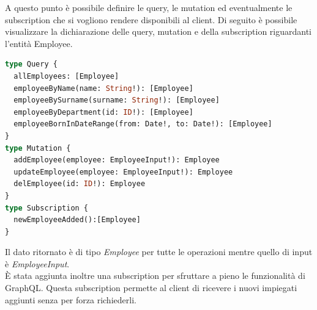 A questo punto è possibile definire le query, le mutation ed eventualmente le subscription che si vogliono rendere disponibili al client. Di seguito è possibile visualizzare la dichiarazione delle query, mutation e della subscription riguardanti l'entità Employee.
\begin{lstlisting}[language=GraphQL, title={schema.graphqls}]
type Query {
  allEmployees: [Employee]
  employeeByName(name: String!): [Employee]
  employeeBySurname(surname: String!): [Employee]
  employeeByDepartment(id: ID!): [Employee]
  employeeBornInDateRange(from: Date!, to: Date!): [Employee]
}
type Mutation {
  addEmployee(employee: EmployeeInput!): Employee
  updateEmployee(employee: EmployeeInput!): Employee
  delEmployee(id: ID!): Employee
}
type Subscription {
  newEmployeeAdded():[Employee]
}
\end{lstlisting}
Il dato ritornato è di tipo \textit{Employee} per tutte le operazioni mentre quello di input è \textit{EmployeeInput}.\\
È stata aggiunta inoltre una subscription per sfruttare a pieno le funzionalità di GraphQL. Questa subscription permette al client di ricevere i nuovi impiegati aggiunti senza per forza richiederli.
